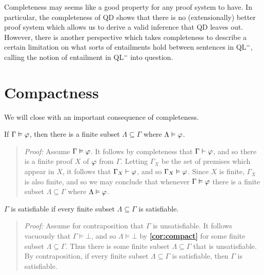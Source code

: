 Completeness may seems like a good property for any proof system to have.
In particular, the completeness of QD shows that there is no (extensionally) better proof system which allows us to derive a valid inference that QD leaves out.
However, there is another perspective which takes completeness to describe a certain limitation on what sorts of entailments hold between sentences in QL$^=$, calling the notion of entailment in QL$^=$ into question.






\section{Compactness}%
  \label{sec:Compactness}
  

We will close with an important consequence of completeness.

\begin{Cthm} \label{cor:compact}
  If $\Gamma\vDash\varphi$, then there is a finite subset $\Lambda\subseteq\Gamma$ where $\Lambda\vDash\varphi$.
\end{Cthm}

\begin{quote} 
  \textit{Proof:} 
Assume $\Gamma\vDash\varphi$.  
It follows by completeness that $\Gamma\vdash\varphi$, and so there is a finite proof $X$ of $\varphi$ from $\Gamma$.
Letting $\Gamma_X$ be the set of premises which appear in $X$, it follows that $\Gamma_X\vdash\varphi$, and so $\Gamma_X\vDash\varphi$.
Since $X$ is finite, $\Gamma_X$ is also finite, and so we may conclude that whenever $\Gamma\vDash\varphi$ there is a finite subset $\Lambda\subseteq\Gamma$ where $\Lambda\vDash\varphi$.
\end{quote}



\begin{Cthm}[Compactness] \label{cor:compact2}
  $\Gamma$ is satisfiable if every finite subset $\Lambda\subseteq\Gamma$ is satisfiable.
\end{Cthm}

\begin{quote} 
  \textit{Proof:} 
  Assume for contraposition that $\Gamma$ is unsatisfiable. 
  It follows vacuously that $\Gamma\models\bot$, and so $\Lambda\models\bot$ by \textbf{\ref{cor:compact}} for some finite subset $\Lambda\subseteq\Gamma$.
  Thus there is some finite subset $\Lambda\subseteq\Gamma$ that is unsatisfiable. 
  By contraposition, if every finite subset $\Lambda\subseteq\Gamma$ is satisfiable, then $\Gamma$ is satisfiable. 
\end{quote}


